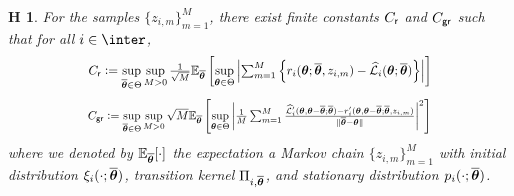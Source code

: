 \documentclass{article}
\newcommand*{\Scale}[2][4]{\scalebox{#1}{$#2$}}%
\newtheorem{assumption}{H\!\!}
\begin{document}
\begin{assumption}\label{controlapprox}
For the samples $\{z_{i,m}\}_{m=1}^{M}$, there exist finite constants $C_{\sf r}$ and $C_{\sf gr}$ such that for all $i \in \inter$,
\[\Scale[0.9]{C_{\sf r} \eqdef \sup \limits_{\op \in \Param} \sup \limits_{M >0} \frac{1}{\sqrt{M}} \EE_{\op}\left[ \sup \limits_{\param \in \Param} \left| \sum_{m=1}^{M}{ \left\{ r_i (\param ; \op, z_{i,m})  - \sur{i}{\param}{\op} \right\} } \right| \right]}\]
\[\Scale[0.83]{C_{\sf gr} \eqdef \sup \limits_{\op \in \Param} \sup \limits_{M >0} \sqrt{M} \EE_{\op}\left[ \sup \limits_{\param \in \Param} \left| \frac{1}{{M}} \sum_{m=1}^{M}{ \frac{
 \widehat{\cal L}_i'( \param , \param - \op; \op ) - r_i' (\param, \param - \op ; \op,  z_{i,m} ) }{\| \op - \param\|} }\right|^2 \right]}\]
where we denoted by $\mathbb{E}_{\op} [\cdot]$ the expectation \wrt a Markov chain $\{z_{i,m}\}_{m=1}^{M}$ with  initial distribution $\xi_{i} (\cdot; \op)$, transition kernel $\Pi_{i,\op}$, and stationary distribution $p_{i}(\cdot; \op)$.
\end{assumption}
\end{document}
